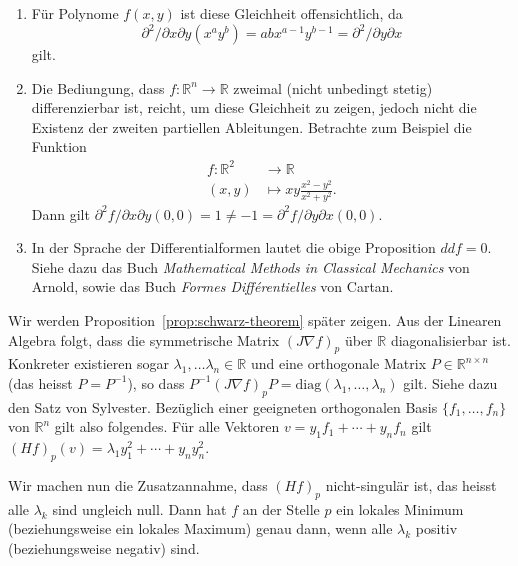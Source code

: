 \documentclass[../main.tex]{subfiles}
\begin{document}
\begin{remark}
  \leavevmode
  \begin{enumerate}[(1)]
    \item Für Polynome $f(x, y)$ ist diese Gleichheit offensichtlich,
      da 
      \[
      \partial^2 / \partial x \partial y (x^a y^b) = ab x^{a-1} y^{b-1}
      = \partial^2 / \partial y \partial x
      \]
      gilt.
    \item
      Die Bediungung, dass $f \colon \mathbb{R}^n \to \mathbb{R}$
      zweimal (nicht unbedingt stetig) differenzierbar ist,
      reicht, um diese Gleichheit zu zeigen, jedoch nicht
      die Existenz der zweiten partiellen Ableitungen.
      Betrachte zum Beispiel die Funktion
      \begin{align*}
        f \colon \mathbb{R}^2 & \to \mathbb{R} \\
        (x, y) & \mapsto xy \frac{x^2 - y^2}{x^2 + y^2}.
      \end{align*}
      Dann gilt $\partial^2 f/ \partial x \partial y (0, 0) = 1
      \neq -1 = \partial^2 f / \partial y \partial x (0, 0)$.
    \item In der Sprache der Differentialformen
      lautet die obige Proposition $ddf = 0$.
      Siehe dazu das Buch \emph{Mathematical Methods in Classical
      Mechanics} von Arnold,
      sowie das Buch \emph{Formes Différentielles} von Cartan.
  \end{enumerate}
  
\end{remark}

Wir werden Proposition~\ref{prop:schwarz-theorem} später zeigen.
Aus der Linearen Algebra folgt, dass
die symmetrische Matrix ${(J \nabla f)}_p$ über $\mathbb{R}$ 
diagonalisierbar ist.
Konkreter existieren sogar
$\lambda_1, \dots \lambda_n \in \mathbb{R}$ und
eine orthogonale Matrix $P \in \mathbb{R}^{n \times n}$ 
(das heisst $P = P^{-1}$), so dass
$P^{-1} {(J \nabla f)}_p P = \text{diag}(\lambda_1, \dots, \lambda_n)$ 
gilt. Siehe dazu den Satz von Sylvester.
Bezüglich einer geeigneten orthogonalen Basis
$\{f_1, \dots, f_n \}$ von $\mathbb{R}^n$ 
gilt also folgendes. Für alle
Vektoren
$v = y_1 f_1 + \cdots + y_n f_n$ gilt
${(Hf)}_p(v) = \lambda_1 y_1^2 + \cdots + y_n y_n^2$.

Wir machen nun die Zusatzannahme, dass ${(Hf)}_p$ nicht-singulär ist,
das heisst alle $\lambda_k$ sind ungleich null.
Dann hat $f$ an der Stelle $p$ ein lokales Minimum (beziehungsweise
ein lokales Maximum)
genau dann, wenn alle $\lambda_k$ positiv (beziehungsweise negativ) sind.
\end{document}
